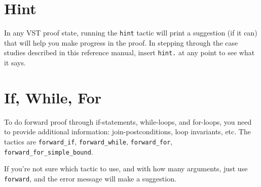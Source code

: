 \documentclass[12pt,fleqn,openany,oneside,showtrims]{memoir}
\begin{document}
\chapter{Hint}
In any VST proof state, running the \lstinline{hint} tactic will print a suggestion (if it can) that will help you make progress in the proof.
In stepping through the case studies described in this reference manual,
insert \lstinline{hint.} at any point to see what it says.


\chapter{If, While, For}
\label{refcard:if-while-for}

To do forward proof through if-statements, while-loops, and for-loops,
you need to provide additional information: join-postconditions, loop invariants, etc.  The tactics are
\lstinline{forward_if},
\lstinline{forward_while},
\lstinline{forward_for},
\lstinline{forward_for_simple_bound}.

If you're not sure which tactic to use, and with how many arguments,
just use \lstinline{forward}, and the error message will make a suggestion.
\end{document}
